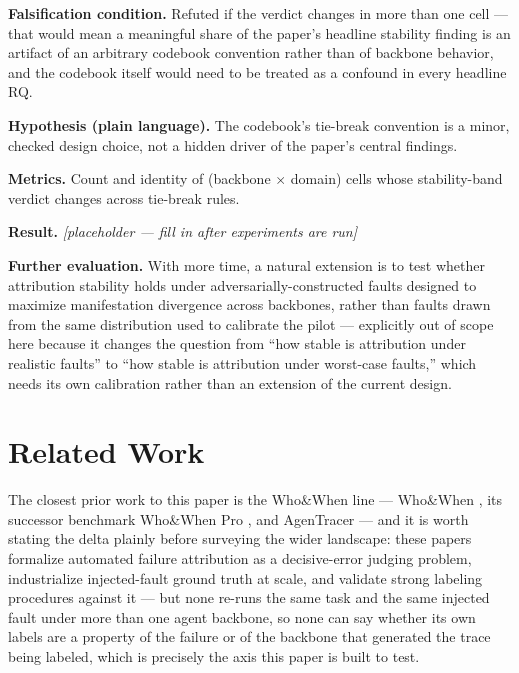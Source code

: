 \documentclass[11pt]{article}
\newcommand{\ph}{\textit{[placeholder --- fill in after experiments are run]}}
\begin{document}
\textbf{Falsification condition.} Refuted if the verdict changes in more than one cell --- that would mean a meaningful share of the paper's headline stability finding is an artifact of an arbitrary codebook convention rather than of backbone behavior, and the codebook itself would need to be treated as a confound in every headline RQ.

\textbf{Hypothesis (plain language).} The codebook's tie-break convention is a minor, checked design choice, not a hidden driver of the paper's central findings.

\textbf{Metrics.} Count and identity of (backbone $\times$ domain) cells whose stability-band verdict changes across tie-break rules.

\textbf{Result.} \ph

\vspace{0.5em}
\noindent\textbf{Further evaluation.} With more time, a natural extension is to test whether attribution stability holds under adversarially-constructed faults designed to maximize manifestation divergence across backbones, rather than faults drawn from the same distribution used to calibrate the pilot --- explicitly out of scope here because it changes the question from ``how stable is attribution under realistic faults'' to ``how stable is attribution under worst-case faults,'' which needs its own calibration rather than an extension of the current design.

\section{Related Work}

The closest prior work to this paper is the Who\&When line --- Who\&When \citep{WhoWhen2025}, its successor benchmark Who\&When Pro \citep{WhoWhenPro2026}, and AgenTracer \citep{AgenTracer2025} --- and it is worth stating the delta plainly before surveying the wider landscape: these papers formalize automated failure attribution as a decisive-error judging problem, industrialize injected-fault ground truth at scale, and validate strong labeling procedures against it --- but none re-runs the same task and the same injected fault under more than one agent backbone, so none can say whether its own labels are a property of the failure or of the backbone that generated the trace being labeled, which is precisely the axis this paper is built to test.
\end{document}
